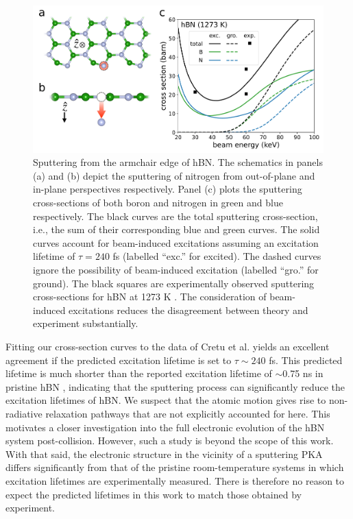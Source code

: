 \documentclass{article}
\begin{document}
\begin{figure} 
  \centering
  \includegraphics[width=\textwidth]{fig5.pdf}
  \caption{
    Sputtering from the armchair edge of hBN.
    The schematics in panels (a) and (b) depict the sputtering of nitrogen from
    out-of-plane and in-plane perspectives respectively.
    Panel (c) plots the sputtering cross-sections of both boron and nitrogen in
    green and blue respectively.
    The black curves are the total sputtering cross-section, i.e., the sum of
    their corresponding blue and green curves.
    The solid curves account for beam-induced excitations assuming an
    excitation lifetime of $\tau=240$ fs (labelled ``exc.'' for excited).
    The dashed curves ignore the possibility of beam-induced excitation
    (labelled ``gro.'' for ground).
    The black squares are experimentally observed sputtering cross-sections
    for hBN at 1273 K \cite{Cretu2015}.
    The consideration of beam-induced excitations reduces the disagreement
    between theory and experiment substantially.
  }
  \label{fig:edgeCross}
\end{figure}

Fitting our cross-section curves to the data of Cretu et al. yields an excellent
agreement if the predicted excitation lifetime is set to $\tau \sim 240$ fs.
This predicted lifetime is much shorter than the reported excitation lifetime
of $\sim$0.75 ns in pristine hBN \cite{Li2016b}, indicating that the sputtering
process can significantly reduce the excitation lifetimes of hBN.
We suspect that the atomic motion gives rise to non-radiative relaxation
pathways that are not explicitly accounted for here. 
This motivates a closer investigation into the full electronic evolution of
the hBN system post-collision.
However, such a study is beyond the scope of this work.
With that said, the electronic structure in the vicinity of a sputtering PKA
differs significantly from that of the pristine room-temperature systems in
which excitation lifetimes are experimentally measured.
There is therefore no reason to expect the predicted lifetimes in this
work to match those obtained by experiment.
\end{document}

